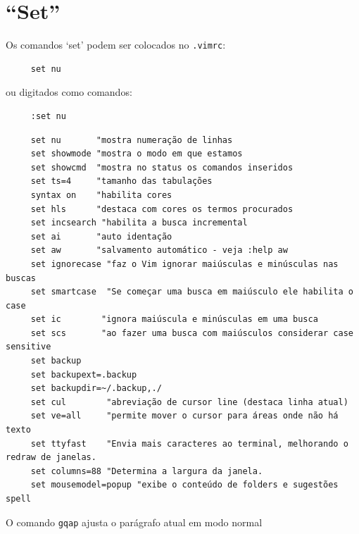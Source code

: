 \documentclass[10pt,a4paper,openany]{book}
\begin{document}
\section{``Set''}
\label{``Set''}
Os comandos `set' podem ser colocados no \verb|.vimrc|:

\begin{verbatim}
     set nu
\end{verbatim}

ou digitados como comandos:

\begin{verbatim}
     :set nu
\end{verbatim}

\begin{verbatim}
     set nu       "mostra numeração de linhas
     set showmode "mostra o modo em que estamos
     set showcmd  "mostra no status os comandos inseridos
     set ts=4     "tamanho das tabulações
     syntax on    "habilita cores
     set hls      "destaca com cores os termos procurados
     set incsearch "habilita a busca incremental
     set ai       "auto identação
     set aw       "salvamento automático - veja :help aw
     set ignorecase "faz o Vim ignorar maiúsculas e minúsculas nas buscas
     set smartcase  "Se começar uma busca em maiúsculo ele habilita o case
     set ic        "ignora maiúscula e minúsculas em uma busca
     set scs       "ao fazer uma busca com maiúsculos considerar case sensitive
     set backup
     set backupext=.backup
     set backupdir=~/.backup,./
     set cul        "abreviação de cursor line (destaca linha atual)
     set ve=all     "permite mover o cursor para áreas onde não há texto
     set ttyfast    "Envia mais caracteres ao terminal, melhorando o redraw de janelas.
     set columns=88 "Determina a largura da janela.
     set mousemodel=popup "exibe o conteúdo de folders e sugestões spell
\end{verbatim}

O comando \verb|gqap| ajusta o parágrafo atual em modo normal
\end{document}
